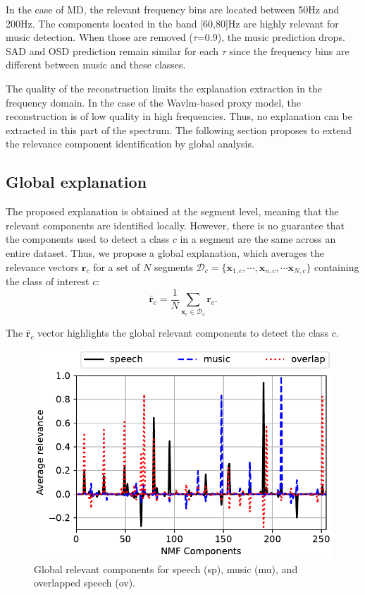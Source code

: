 In the case of MD, the relevant frequency bins are located between 50Hz and 200Hz.
The components located in the band [60,80]Hz are highly relevant for music detection.
When those are removed ($\tau$=0.9), the music prediction drops.
SAD and OSD prediction remain similar for each $\tau$ since the frequency bins are different between music and these classes.

The quality of the reconstruction limits the explanation extraction in the frequency domain.
In the case of the Wavlm-based proxy model, the reconstruction is of low quality in high frequencies. 
Thus, no explanation can be extracted in this part of the spectrum.
The following section proposes to extend the relevance component identification by global analysis.

\subsection{Global explanation}

The proposed explanation is obtained at the segment level, meaning that the relevant components are identified locally.
However, there is no guarantee that the components used to detect a class $c$ in a segment are the same across an entire dataset.
Thus, we propose a global explanation, which averages the relevance vectors $\mathbf{r}_{c}$ for a set of $N$ segments $\mathcal{D}_c=\{\mathbf{x}_{1,c}, \cdots, \mathbf{x}_{n,c}, \cdots \mathbf{x}_{N,c}\}$ containing the class of interest $c$:
\begin{equation}
    \bar{\mathbf{r}}_{c} = \frac{1}{N}\sum_{\mathbf{x}_{c}\in\mathcal{D}_c} \mathbf{r}_c.
    \label{eq:avg_rel}
\end{equation}

The $\bar{\mathbf{r}}_{c}$ vector highlights the global relevant components to detect the class $c$.

\begin{figure}[htb]
    \centering
    \includegraphics[width=\linewidth]{figs/r_kc_acc.pdf}
    \caption{Global relevant components for speech (sp), music (mu), and overlapped speech (ov).}
    \label{fig:global_exp}
\end{figure}


